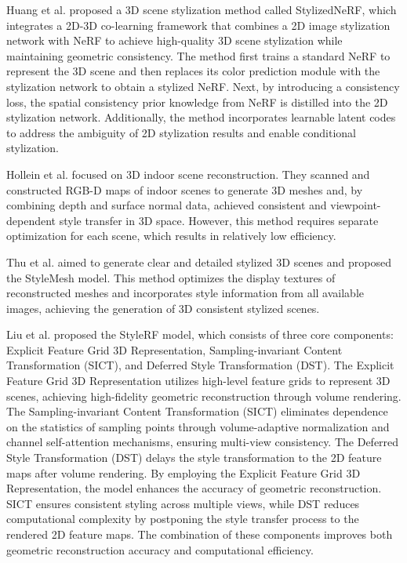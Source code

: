 \documentclass[preprint,12pt]{elsarticle}
\begin{document}
Huang et al.\citep{93huang2022stylizednerf} proposed a 3D scene stylization method called StylizedNeRF, which integrates a 2D-3D co-learning framework that combines a 2D image stylization network with NeRF to achieve high-quality 3D scene stylization while maintaining geometric consistency. The method first trains a standard NeRF to represent the 3D scene and then replaces its color prediction module with the stylization network to obtain a stylized NeRF. Next, by introducing a consistency loss, the spatial consistency prior knowledge from NeRF is distilled into the 2D stylization network. Additionally, the method incorporates learnable latent codes to address the ambiguity of 2D stylization results and enable conditional stylization.

Hollein et al.\citep{86hollein2022stylemesh} focused on 3D indoor scene reconstruction. They scanned and constructed RGB-D maps of indoor scenes to generate 3D meshes and, by combining depth and surface normal data, achieved consistent and viewpoint-dependent style transfer in 3D space. However, this method requires separate optimization for each scene, which results in relatively low efficiency.

Thu et al.\citep{91nguyen2022snerf} aimed to generate clear and detailed stylized 3D scenes and proposed the StyleMesh model. This method optimizes the display textures of reconstructed meshes and incorporates style information from all available images, achieving the generation of 3D consistent stylized scenes.

Liu et al.\citep{82liu2023stylerf} proposed the StyleRF model, which consists of three core components: Explicit Feature Grid 3D Representation, Sampling-invariant Content Transformation (SICT), and Deferred Style Transformation (DST). The Explicit Feature Grid 3D Representation utilizes high-level feature grids to represent 3D scenes, achieving high-fidelity geometric reconstruction through volume rendering. The Sampling-invariant Content Transformation (SICT) eliminates dependence on the statistics of sampling points through volume-adaptive normalization and channel self-attention mechanisms, ensuring multi-view consistency. The Deferred Style Transformation (DST) delays the style transformation to the 2D feature maps after volume rendering. By employing the Explicit Feature Grid 3D Representation, the model enhances the accuracy of geometric reconstruction. SICT ensures consistent styling across multiple views, while DST reduces computational complexity by postponing the style transfer process to the rendered 2D feature maps. The combination of these components improves both geometric reconstruction accuracy and computational efficiency.
\end{document}
